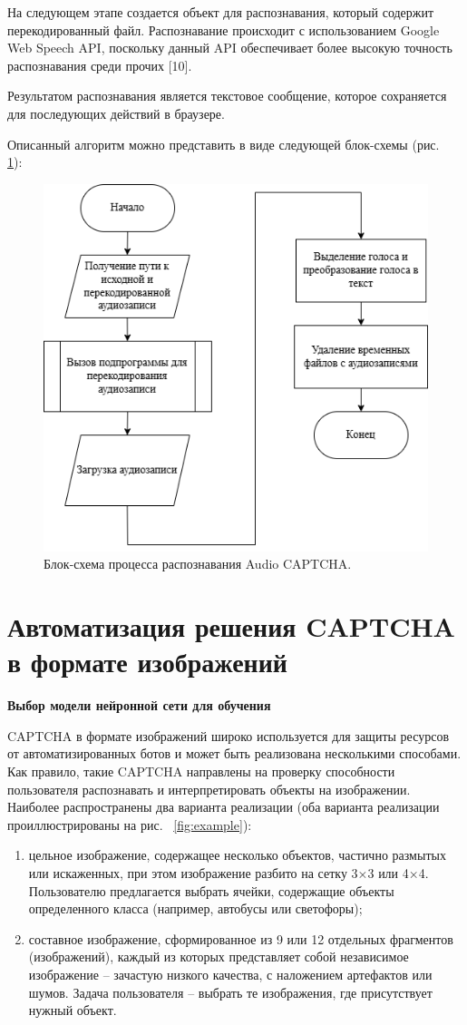 На следующем этапе создается объект для распознавания, который содержит 
перекодированный файл. Распознавание происходит с использованием Google Web 
Speech API, поскольку данный API обеспечивает более высокую точность 
распознавания среди прочих [10].

Результатом распознавания является текстовое сообщение, которое сохраняется для 
последующих действий в браузере.

Описанный алгоритм можно представить в виде следующей блок-схемы (рис.~
\ref{fig:recognize-audio}):

\begin{figure}[H]
    \centering
    \includegraphics[width=0.6\linewidth]{
        imgs/audiocaptcha/recognize_audiocaptcha.png
    }
    \caption{Блок-схема процесса распознавания Audio CAPTCHA.}
    \label{fig:recognize-audio}
\end{figure}

\section{Автоматизация решения CAPTCHA в формате изображений}

\textbf{Выбор модели нейронной сети для обучения}

CAPTCHA в формате изображений широко используется для защиты ресурсов от 
автоматизированных ботов и может быть реализована несколькими способами. Как 
правило, такие CAPTCHA направлены на проверку способности пользователя 
распознавать и интерпретировать объекты на изображении. Наиболее распространены 
два варианта реализации (оба варианта реализации проиллюстрированы на рис.~
\ref{fig:example}):

\begin{enumerate}
    \item цельное изображение, содержащее несколько объектов, частично размытых 
    или искаженных, при этом изображение разбито на сетку 3×3 или 4×4. 
    Пользователю предлагается выбрать ячейки, содержащие объекты определенного 
    класса (например, автобусы или светофоры);
    \item составное изображение, сформированное из 9 или 12 отдельных фрагментов 
    (изображений), каждый из которых представляет собой независимое изображение 
    -- зачастую низкого качества, с наложением артефактов или шумов. Задача 
    пользователя -- выбрать те изображения, где присутствует нужный объект.
\end{enumerate}

